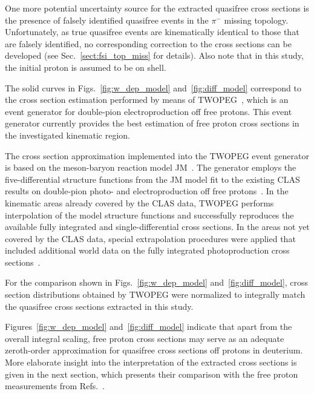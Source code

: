 \documentclass[prc,twocolumn,superscriptaddress,showpacs,amssymb,amsmath,amsfonts,aps,nofootinbib]{revtex4-1}
\begin{document}
One more potential uncertainty source for the extracted quasifree cross sections is the presence of falsely identified quasifree events in the $\pi^{-}$ missing topology. Unfortunately, as true quasifree events are kinematically identical to those that are falsely identified, no corresponding correction to the cross sections can be developed (see Sec.\!~\ref{sect:fsi_top_miss} for details). Also note that in this study, the initial proton is assumed to be on shell.

The solid curves in Figs.~\ref{fig:w_dep_model} and~\ref{fig:diff_model} correspond to the cross section estimation performed by means of TWOPEG~\cite{twopeg}, which is an event generator for double-pion electroproduction off free protons. This event generator currently provides the best estimation of free proton cross sections in the investigated kinematic region.


The cross section approximation implemented into the TWOPEG event generator is based on the meson-baryon reaction model JM~\cite{Mokeev:2008iw,Mokeev:2012vsa,Mokeev:2015lda}. The generator employs the five-differential structure functions from the JM model fit to the existing CLAS results on double-pion photo- and electroproduction off free protons~\cite{Ripani:2002ss,Mokeev:2012vsa,Fedotov:2008aa,Golovach}. In the kinematic areas already covered by the CLAS data, TWOPEG performs interpolation of the model structure functions and successfully reproduces the available fully integrated and single-differential cross sections. In the areas not yet covered by the CLAS data, special extrapolation procedures were applied that included additional world data on the fully integrated photoproduction cross sections~\cite{Wu:2005wf,ABBHHM:1968aa}. 


For the comparison shown in Figs.~\ref{fig:w_dep_model} and~\ref{fig:diff_model}, cross section distributions obtained by TWOPEG were normalized to integrally match the quasifree cross sections extracted in this study.


Figures~\ref{fig:w_dep_model} and~\ref{fig:diff_model} indicate that apart from the overall integral scaling, free proton cross sections may serve as an adequate zeroth-order approximation for quasifree cross sections off protons in deuterium. More elaborate insight into the interpretation of the extracted cross sections is given in the next section, which presents their comparison with the free proton measurements from Refs.\!~\cite{Fed_an_note:2017,Fed_paper_2018}.
\end{document}
